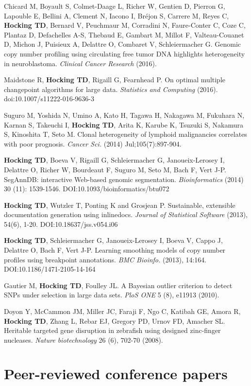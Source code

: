 \documentclass[margin,line]{res}
\begin{document}
\begin{resume}
Chicard M, Boyault S, Colmet-Daage L, Richer W, Gentien D, Pierron G,
Lapouble E, Bellini A, Clement N, Iacono I, Bréjon S, Carrere M, Reyes
C, {\bf Hocking TD}, Bernard V, Peuchmaur M, Corradini N, Faure-Conter
C, Coze C, Plantaz D, Defachelles A-S, Thebaud E, Gambart M, Millot F,
Valteau-Couanet D, Michon J, Puisieux A, Delattre O, Combaret V,
Schleiermacher G. Genomic copy number profiling using circulating free
tumor DNA highlights heterogeneity in neuroblastoma. {\it Clinical Cancer
Research} (2016).

Maidstone R, {\bf Hocking TD}, Rigaill G, Fearnhead P. On optimal
multiple changepoint algorithms for large data. {\it Statistics and
Computing} (2016). doi:10.1007/s11222-016-9636-3 

Suguro M, Yoshida N, Umino A, Kato H, Tagawa H, Nakagawa M, Fukuhara
N, Karnan S, Takeuchi I, {\bf Hocking TD}, Arita K, Karube K, Tsuzuki
S, Nakamura S, Kinoshita T, Seto M. Clonal heterogeneity of lymphoid
malignancies correlates with poor prognosis. {\it Cancer Sci.} (2014)
Jul;105(7):897-904.

{\bf Hocking TD}, Boeva V, Rigaill G, Schleiermacher G,
Janoueix-Lerosey I, Delattre O, Richer W, Bourdeaut F, Suguro M, Seto
M, Bach F, Vert J-P. SegAnnDB: interactive Web-based genomic
segmentation. {\it Bioinformatics} (2014) 30 (11):
1539-1546. DOI:10.1093/bioinformatics/btu072

{\bf Hocking TD}, Wutzler T, Ponting K and Grosjean P. Sustainable,
extensible documentation generation using inlinedocs. {\it Journal of
Statistical Software} (2013), 54(6), 1-20. DOI:10.18637/jss.v054.i06

{\bf Hocking TD}, Schleiermacher G, Janoueix-Lerosey I, Boeva V, Cappo
J, Delattre O, Bach F, Vert J-P. Learning smoothing models of copy
number profiles using breakpoint annotations. {\it BMC Bioinfo.} (2013),
14:164. DOI:10.1186/1471-2105-14-164

Gautier M, {\bf Hocking TD}, Foulley JL. A Bayesian outlier criterion
to detect SNPs under selection in large data sets. {\it PloS ONE} 5
(8), e11913 (2010).

Doyon Y, McCammon JM, Miller JC, Faraji F, Ngo C, Katibah GE, Amora R,
{\bf Hocking TD}, Zhang L, Rebar EJ, Gregory PD, Urnov FD, Amacher
SL. Heritable targeted gene disruption in zebrafish using designed
zinc-finger nucleases. {\it Nature biotechnology} 26 (6), 702-70
(2008).

\section{\sc Peer-reviewed conference papers}


\end{resume}
\end{document}
